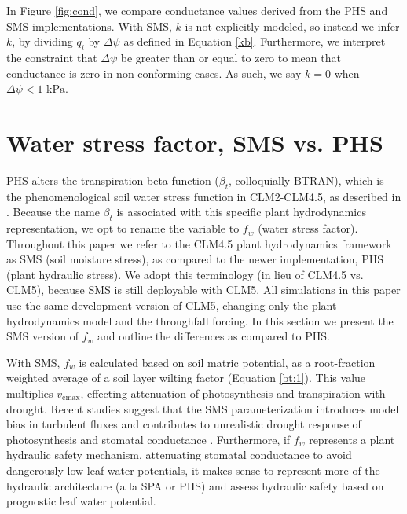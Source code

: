 \documentclass[draft,linenumbers]{agujournal}
\begin{document}
    In Figure \ref{fig:cond}, we compare conductance values derived from the PHS and SMS implementations.
    With SMS, $k$ is not explicitly modeled, so instead we infer $k$, 
    by dividing $q_i$ by $\Delta\psi$ as defined in Equation \ref{kb}.
    Furthermore, we interpret the constraint that $\Delta\psi$ be greater than or equal to zero to mean 
    that conductance is zero in non-conforming cases. As such, we say $k=0$ when $\Delta\psi<\text{1 kPa}$.
    

\section{Water stress factor, SMS vs. PHS}
\label{sect:btran}
    PHS alters the transpiration beta function ($\beta_t$, colloquially BTRAN), 
    which is the phenomenological soil water stress function in CLM2-CLM4.5, as described in \citet{oleson2013}.
    Because the name $\beta_t$ is associated with this specific plant hydrodynamics representation, we opt to rename the variable to $f_w$ (water stress factor).
    Throughout this paper we refer to the CLM4.5 plant hydrodynamics framework as SMS (soil moisture stress), 
    as compared to the newer implementation, PHS (plant hydraulic stress).
    We adopt this terminology (in lieu of CLM4.5 vs. CLM5), because SMS is still deployable with CLM5. 
    All simulations in this paper use the same development version of CLM5, changing only the plant hydrodynamics model and the throughfall forcing.
    In this section we present the SMS version of $f_w$ and outline the differences as compared to PHS.
    
    With SMS, $f_w$ is calculated based on soil matric potential, as a root-fraction weighted average of a soil layer wilting factor (Equation \ref{bt:1}).
    This value multiplies $v_{\text{cmax}}$, effecting attenuation of photosynthesis and transpiration with drought.
    Recent studies suggest that the SMS parameterization introduces model bias in turbulent fluxes \citep{bonan2014}
    and contributes to unrealistic drought response of photosynthesis and stomatal conductance \citep{powell2013}.
    Furthermore, if $f_w$ represents a plant hydraulic safety mechanism, attenuating stomatal conductance to avoid
    dangerously low leaf water potentials, it makes sense to represent more of the hydraulic architecture (a la SPA or PHS)
    and assess hydraulic safety based on prognostic leaf water potential.
    
\end{document}
